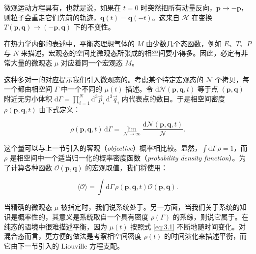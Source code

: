 微观运动方程具有，也就是说，如果在 $t=0$ 时突然把所有动量反向，$\bm p\to-\bm p$，则粒子会重走它们先前的轨迹，$\bm q(t)=\bm q(-t)$。这来自 $\mathscr H$ 在变换 $T(\bm p,\bm q)\to(-\bm p,\bm q)$ 下的不变性。


在热力学内部的表述中，平衡态理想气体的 $M$ 由少数几个态函数，例如 $E$、$T$、$P$ 与 $N$ 来描述。宏观态的空间比微观态所张成的相空间要小得多。因此，必定有非常大量的微观态 $\mu$ 对应着同一个宏观态 $M$。

这种多对一的对应提示我们引入微观态的。考虑某个特定宏观态的 $\mathcal{N}$ 个拷贝，每一个都由相空间 $\Gamma$ 中一个不同的 $\mu(t)$ 描述。令 $\mathrm{d}\mathcal{N}(\bm p,\bm q,t)$ 等于点 $(\bm p,\bm q)$ 附近无穷小体积 $\mathrm{d}\Gamma=\prod_{i=1}^N \mathrm{d}^3\vec p_i\,\mathrm{d}^3\vec q_i$ 内代表点的数目。于是相空间密度 $\rho(\bm p,\bm q,t)$ 由下式定义：

\begin{equation}\label{eq:3.2}
  \rho(\bm p,\bm q,t)\,\mathrm{d}\Gamma=\lim_{\mathcal{N}\to\infty}\frac{\mathrm{d}\mathcal{N}(\bm p,\bm q,t)}{\mathcal{N}}.
\end{equation}

这个量可以与上一节引入的客观（\textit{objective}）概率相比较。显然，$\int \mathrm{d}\Gamma\,\rho=1$，而 $\rho$ 是相空间中一个适当归一化的概率密度函数（\textit{probability density function}）。为了计算各种函数 $\mathcal{O}(\bm p,\bm q)$ 的宏观取值，我们将使用：

\begin{equation}\label{eq:3.3}
  \langle\mathcal{O}\rangle=\int \mathrm{d}\Gamma\,\rho(\bm p,\bm q,t)\mathcal{O}(\bm p,\bm q).
\end{equation}

当精确的微观态 $\mu$ 被指定时，我们说系统处于。另一方面，当我们关于系统的知识是概率性的，其意义是系统取自一个具有密度 $\rho(\Gamma)$ 的系综，则说它属于。在纯态的语境中很难描述平衡，因为 $\mu(t)$ 按照式 \eqref{eq:3.1} 不断地随时间变化。对混合态而言，更方便的做法是考察相空间密度 $\rho(t)$ 的时间演化来描述平衡，而它由下一节引入的 Liouville 方程支配。


